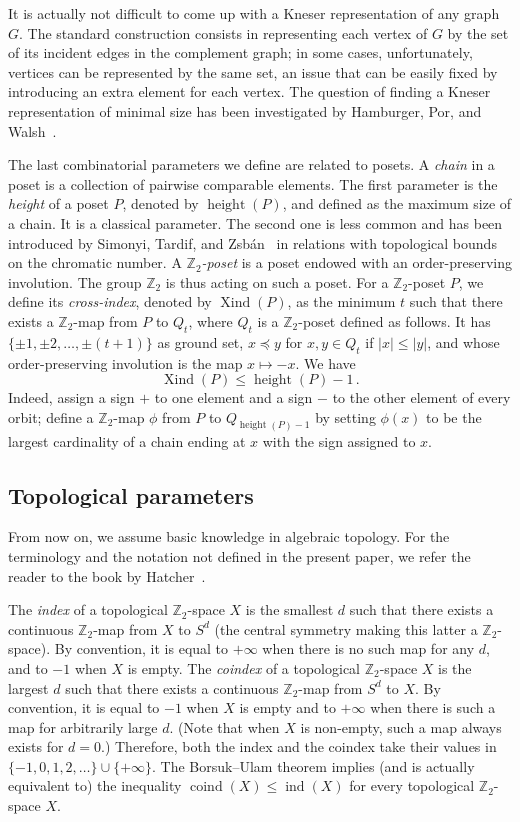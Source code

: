 \documentclass[12pt]{amsart}
\theoremstyle{definition}
\def\Z{\mathbb{Z}}
\renewcommand{\leq}{\leqslant}
\renewcommand{\preceq}{\preccurlyeq}
\def\coind{\operatorname{coind}}
\def\ind{\operatorname{ind}}
\def\Xind{\operatorname{Xind}}
\def\height{\operatorname{height}}
\begin{document}
It is actually not difficult to come up with a Kneser representation of any graph $G$. The standard construction consists in representing each vertex of $G$ by the set of its incident edges in the complement graph; in some cases, unfortunately, vertices can be represented by the same set, an issue that can be easily fixed by introducing an extra element for each vertex. The question of finding a Kneser representation of minimal size has been investigated by Hamburger, Por, and Walsh~\cite{hamburger2009kneser}.


The last combinatorial parameters we define are related to posets. A {\em chain} in a poset is a collection of pairwise comparable elements. The first parameter is the {\em height} of a poset $P$, denoted by $\height(P)$, and defined as the maximum size of a chain. It is a classical parameter. The second one is less common and has been introduced by Simonyi, Tardif, and Zsb\'an~\cite{simonyi2013colourful} in relations with topological bounds on the chromatic number. A {\em $\Z_2$-poset} is a poset endowed with an order-preserving involution. The group $\Z_2$ is thus acting on such a poset. For a $\Z_2$-poset $P$, we define its {\em cross-index}, denoted by $\Xind(P)$, as the minimum $t$ such that there exists a $\Z_2$-map from $P$ to $Q_t$, where $Q_t$ is a $\Z_2$-poset defined as follows. It has $\{\pm 1,\pm 2,\ldots, \pm (t+1)\}$ as ground set, $x\preceq y$ for $x,y\in Q_t$ if $|x|\leq |y|$, and whose order-preserving involution is the map $x\mapsto -x$. We have 
\begin{equation}\label{eq:hP}
    \Xind(P) \leq \height(P) -1 \, .
\end{equation}
Indeed, assign a sign $+$ to one element and a sign $-$ to the other element of every orbit; define a $\Z_2$-map $\phi$ from $P$ to $Q_{\height(P)-1}$ by setting $\phi(x)$ to be the largest cardinality of a chain ending at $x$ with the sign assigned to $x$.

\subsection{Topological parameters}\label{subsec:topol} From now on, we assume basic knowledge in algebraic topology. For the terminology and the notation not defined in the present paper, we refer the reader to the book by Hatcher~\cite{hatcher2005algebraic}.

The {\em index} of a topological $\Z_2$-space $X$ is the smallest $d$ such that there exists a continuous $\Z_2$-map from $X$ to $S^d$ (the central symmetry making this latter a $\Z_2$-space). By convention, it is equal to $+\infty$ when there is no such map for any $d$, and to $-1$ when $X$ is empty. The {\em coindex} of a topological $\Z_2$-space $X$ is the largest $d$ such that there exists a continuous $\Z_2$-map from $S^d$ to $X$. By convention, it is equal to $-1$ when $X$ is empty and to $+\infty$ when there is such a map for arbitrarily large $d$. (Note that when $X$ is non-empty, such a map always exists for $d=0$.) Therefore, both the index and the coindex take their values in $\{-1,0,1,2,\ldots\} \cup \{+\infty\}$. The Borsuk--Ulam theorem implies (and is actually equivalent to) the inequality $\coind(X) \leq \ind(X)$ for every topological $\Z_2$-space $X$.
\end{document}
